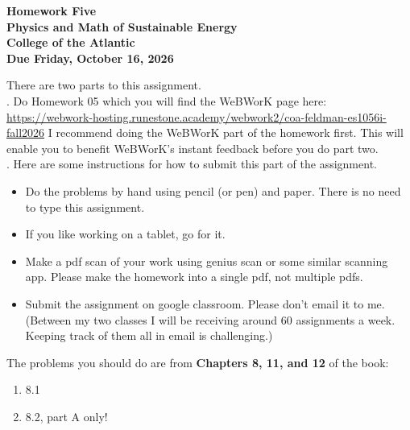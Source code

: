\documentclass[11pt]{article}
\begin{document}
\pagestyle{empty}
 
\begin{center}
{\LARGE {\bf Homework Five}}\\
\bigskip
{\Large {\bf Physics and Math of Sustainable Energy}}\\
\bigskip
{\Large {\bf College of the Atlantic}}\\
\bigskip
{ {\bf Due Friday, October 16, 2026}}\\ 
\end{center}
\medskip


\noindent There are two parts to this assignment.\\

.  Do Homework 05 which you
will find the WeBWorK page here:
\url{https://webwork-hosting.runestone.academy/webwork2/coa-feldman-es1056i-fall2026}
I recommend doing the WeBWorK part of the homework first.  This will
enable you to benefit WeBWorK's instant feedback before you do part
two.\\ 


.  Here are some
instructions for how to submit this part of the assignment.
\begin{itemize}
\item Do the problems by hand using pencil (or pen) and paper.
  There is no need to type this assignment.
\item If you like working on a tablet, go for it. 
\item Make a pdf scan of your work using genius scan or some
  similar scanning app.  Please make the homework into a single
  pdf, not multiple pdfs.
\item Submit the assignment on google classroom.  Please don't
  email it to me.  (Between my two classes I will be receiving
  around 60 assignments a week.  Keeping track of them all in email 
  is challenging.)\\
\end{itemize}



\noindent The problems you should do are from {\bf Chapters
  8, 11, and 12} of the book:  \\ 


\begin{enumerate}
\setlength{\itemsep}{-1mm}
\item 8.1
\item 8.2, part A only!
\end{enumerate}
\end{document}
